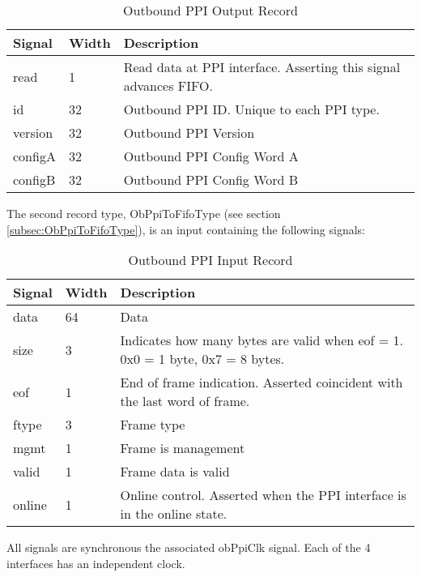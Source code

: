 \documentclass[11pt]{article}
\begin{document}
\begin{table}[H]
\small
\centering
   \begin{tabular}{| l | l | l | }
      \hline \textbf{Signal} & \textbf{Width}  & \textbf{Description} \\
      \hline read    & 1     & Read data at PPI interface. Asserting this signal advances FIFO. \\
      \hline id      & 32    & Outbound PPI ID. Unique to each PPI type.  \\
      \hline version & 32    & Outbound PPI Version       \\
      \hline configA & 32    & Outbound PPI Config Word A       \\
      \hline configB & 32    & Outbound PPI Config Word B       \\
      \hline
   \end{tabular}
   \caption{Outbound PPI Output Record}
\end{table}

The second record type, ObPpiToFifoType (see section \ref{subsec:ObPpiToFifoType}), is an input containing the following signals:

\begin{table}[H]
\small
\centering
   \begin{tabular}{| l | l | l | }
      \hline \textbf{Signal} & \textbf{Width}  & \textbf{Description} \\
      \hline data    & 64    & Data       \\
      \hline size    & 3     & Indicates how many bytes are valid when eof = 1. 0x0 = 1 byte, 0x7 = 8 bytes.       \\
      \hline eof     & 1     & End of frame indication. Asserted coincident with the last word of frame.       \\
      \hline ftype   & 3     & Frame type       \\
      \hline mgmt    & 1     & Frame is management       \\
      \hline valid   & 1     & Frame data is valid       \\
      \hline online & 1  & Online control. Asserted when the PPI interface is in the online state. \\
      \hline
   \end{tabular}
   \caption{Outbound PPI Input Record}
\end{table}

All signals are synchronous the associated obPpiClk signal. Each of the 4 interfaces has an independent clock.
\end{document}
